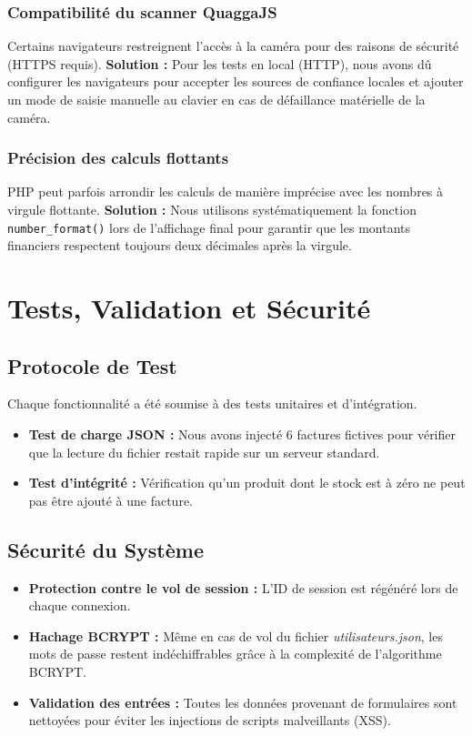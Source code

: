 \documentclass[12pt,a4paper]{report}
\begin{document}
\subsection{Compatibilité du scanner QuaggaJS}
Certains navigateurs restreignent l'accès à la caméra pour des raisons de sécurité (HTTPS requis).
\textbf{Solution :} Pour les tests en local (HTTP), nous avons dû configurer les navigateurs pour accepter les sources de confiance locales et ajouter un mode de saisie manuelle au clavier en cas de défaillance matérielle de la caméra.

\subsection{Précision des calculs flottants}
PHP peut parfois arrondir les calculs de manière imprécise avec les nombres à virgule flottante.
\textbf{Solution :} Nous utilisons systématiquement la fonction \texttt{number\_format()} lors de l'affichage final pour garantir que les montants financiers respectent toujours deux décimales après la virgule.

\chapter{Tests, Validation et Sécurité}
\section{Protocole de Test}
Chaque fonctionnalité a été soumise à des tests unitaires et d'intégration.
\begin{itemize}
    \item \textbf{Test de charge JSON :} Nous avons injecté 6 factures fictives pour vérifier que la lecture du fichier restait rapide sur un serveur standard.
    \item \textbf{Test d'intégrité :} Vérification qu'un produit dont le stock est à zéro ne peut pas être ajouté à une facture.
\end{itemize}

\section{Sécurité du Système}
\begin{itemize}
    \item \textbf{Protection contre le vol de session :} L'ID de session est régénéré lors de chaque connexion.
    \item \textbf{Hachage BCRYPT :} Même en cas de vol du fichier \textit{utilisateurs.json}, les mots de passe restent indéchiffrables grâce à la complexité de l'algorithme BCRYPT.
    \item \textbf{Validation des entrées :} Toutes les données provenant de formulaires sont nettoyées pour éviter les injections de scripts malveillants (XSS).
\end{itemize}
\end{document}
